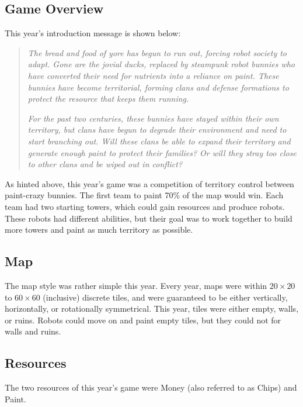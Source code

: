 \documentclass{article}
\begin{document}
  \subsection{Game Overview}

  This year's introduction message is shown below:

  \begin{quote}
    \textit{The bread and food of yore has begun to run out, forcing robot society to adapt. Gone are the jovial ducks, replaced by steampunk robot bunnies who have converted their need for nutrients into a reliance on paint. These bunnies have become territorial, forming clans and defense formations to protect the resource that keeps them running.}
    
    \medskip
    
    \textit{For the past two centuries, these bunnies have stayed within their own territory, but clans have begun to degrade their environment and need to start branching out. Will these clans be able to expand their territory and generate enough paint to protect their families? Or will they stray too close to other clans and be wiped out in conflict?}
  \end{quote}

  As hinted above, this year's game was a competition of territory control between paint-crazy bunnies. The first team to paint 70\% of the map would win. Each team had two starting towers, which could gain resources and produce robots. These robots had different abilities, but their goal was to work together to build more towers and paint as much territory as possible.

  \subsection{Map}

  The map style was rather simple this year. Every year, maps were within $20 \times 20$ to $60 \times 60$ (inclusive) discrete tiles, and were guaranteed to be either vertically, horizontally, or rotationally symmetrical. This year, tiles were either empty, walls, or ruins. Robots could move on and paint empty tiles, but they could not for walls and ruins. 

  \subsection{Resources}

  The two resources of this year's game were Money (also referred to as Chips) and Paint.
  
\end{document}

